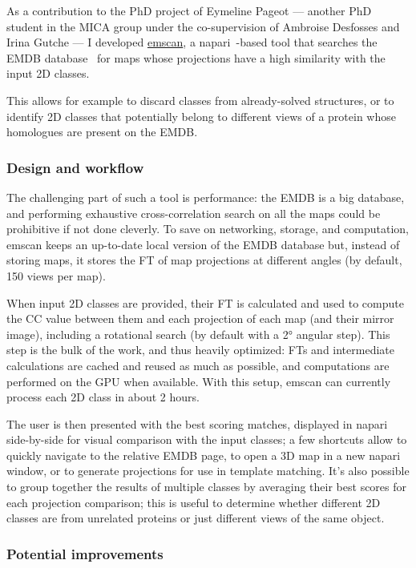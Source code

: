As a contribution to the PhD project of Eymeline Pageot --- another PhD student in the MICA group under the co-supervision of Ambroise Desfosses and Irina Gutche --- I developed \href{https://gihub.com/brisvag/emscan}{emscan}, a napari~\cite{thenaparicommunityNapariMultidimensionalImage2024}-based tool that searches the EMDB database~\cite{thewwpdbconsortiumEMDBElectronMicroscopy2024} for maps whose projections have a high similarity with the input 2D classes.

This allows for example to discard classes from already-solved structures, or to identify 2D classes that potentially belong to different views of a protein whose homologues are present on the EMDB.

\subsubsection{Design and workflow}

The challenging part of such a tool is performance: the EMDB is a big database, and performing exhaustive cross-correlation search on all the maps could be prohibitive if not done cleverly.
To save on networking, storage, and computation, emscan keeps an up-to-date local version of the EMDB database but, instead of storing maps, it stores the FT of map projections at different angles (by default, 150 views per map).

When input 2D classes are provided, their FT is calculated and used to compute the CC value between them and each projection of each map (and their mirror image), including a rotational search (by default with a 2° angular step).
This step is the bulk of the work, and thus heavily optimized: FTs and intermediate calculations are cached and reused as much as possible, and computations are performed on the GPU when available.
With this setup, emscan can currently process each 2D class in about 2 hours.

The user is then presented with the best scoring matches, displayed in napari side-by-side for visual comparison with the input classes; a few shortcuts allow to quickly navigate to the relative EMDB page, to open a 3D map in a new napari window, or to generate projections for use in template matching.
It's also possible to group together the results of multiple classes by averaging their best scores for each projection comparison; this is useful to determine whether different 2D classes are from unrelated proteins or just different views of the same object.

\subsubsection{Potential improvements}

